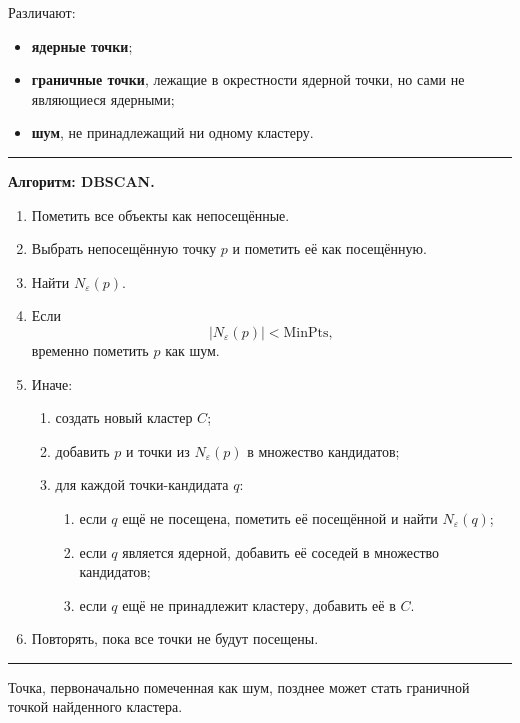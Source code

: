 \documentclass[12pt,a4paper]{article}
\theoremstyle{definition}
\theoremstyle{remark}
\newenvironment{algorithmbox}[1]
{
    \begin{center}
    \begin{minipage}{0.96\textwidth}
    \hrule
    \medskip
    \textbf{Алгоритм: #1.}
    \par\smallskip
}
{
    \medskip
    \hrule
    \end{minipage}
    \end{center}
}
\begin{document}
Различают:

\begin{itemize}
    \item \textbf{ядерные точки};
    \item \textbf{граничные точки}, лежащие в окрестности ядерной точки,
          но сами не являющиеся ядерными;
    \item \textbf{шум}, не принадлежащий ни одному кластеру.
\end{itemize}

\begin{algorithmbox}{DBSCAN}
\begin{enumerate}
    \item Пометить все объекты как непосещённые.
    \item Выбрать непосещённую точку $p$ и пометить её как посещённую.
    \item Найти $N_\varepsilon(p)$.
    \item Если
          \[
              |N_\varepsilon(p)|<\mathrm{MinPts},
          \]
          временно пометить $p$ как шум.
    \item Иначе:
    \begin{enumerate}
        \item создать новый кластер $C$;
        \item добавить $p$ и точки из $N_\varepsilon(p)$ в множество
              кандидатов;
        \item для каждой точки-кандидата $q$:
        \begin{enumerate}
            \item если $q$ ещё не посещена, пометить её посещённой и найти
                  $N_\varepsilon(q)$;
            \item если $q$ является ядерной, добавить её соседей
                  в множество кандидатов;
            \item если $q$ ещё не принадлежит кластеру, добавить её в $C$.
        \end{enumerate}
    \end{enumerate}
    \item Повторять, пока все точки не будут посещены.
\end{enumerate}
\end{algorithmbox}

Точка, первоначально помеченная как шум, позднее может стать граничной
точкой найденного кластера.
\end{document}
